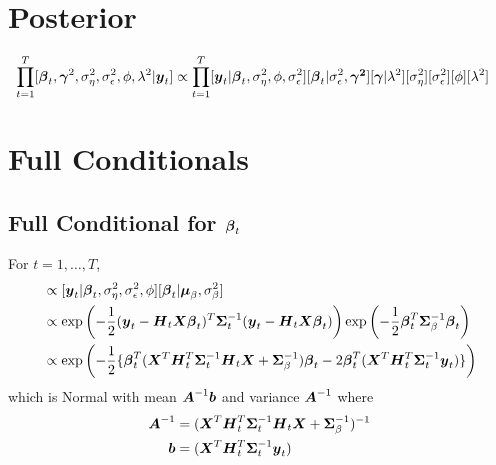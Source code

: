 \documentclass[fleqn]{article}
\def\bm#1{\mbox{\boldmath $#1$}}
\begin{document}
\section{Posterior}
%
\begin{align*}
\prod_{t = 1}^T [\bm{\beta}_t, \bm{\gamma}^2, \sigma^2_\eta, \sigma^2_\epsilon, \phi, \lambda^2 | \bm{y}_t] & \propto \prod_{t = 1}^T [\bm{y}_t | \bm{\beta}_t, \sigma^2_\eta, \phi, \sigma^2_\epsilon] [\bm{\beta}_t | \sigma^2_\epsilon, \bm{\gamma^2}] [\bm{\gamma} | \lambda^2] [\sigma^2_\eta] [\sigma^2_\epsilon] [\phi] [\lambda^2]
\end{align*}
%
\section{Full Conditionals}
%
\subsection{Full Conditional for $\bm{\beta}_t$}
%
For $t = 1, \ldots, T$,
\begin{align*}
[\bm{\beta}_t | \cdot] & \propto [\bm{y}_t | \bm{\beta}_t, \sigma^2_\eta, \sigma^2_\epsilon, \phi] [\bm{\beta}_t | \bm{\mu}_\beta, \sigma^2_\beta]\\
%
& \propto \exp{ \left( - \frac{1} {2} (\bm{y}_t - \bm{H}_t \bm{X} \bm{\beta}_t)^T \bm{\Sigma}_t^{ - 1} (\bm{y}_t - \bm{H}_t \bm{X} \bm{\beta}_t) \right) } \exp{ \left( - \frac{1} {2} \bm{\beta}_t^T \bm{\Sigma}_\beta^{ - 1} \bm{\beta}_t \right) }\\
%
& \propto \exp{ \left( - \frac{1} {2} \{\bm{\beta}_t^T (\bm{X}^T \bm{H}_t^T \bm{\Sigma}_t^{ - 1} \bm{H}_t \bm{X} + \bm{\Sigma}_\beta^{ - 1}) \bm{\beta}_t - 2 \bm{\beta}_t^T (\bm{X}^T \bm{H}_t^T \bm{\Sigma}_t^{ - 1} \bm{y}_t) \} \right) }
\end{align*}
%
which is Normal with mean $ \bm{A}^{ - 1} \bm{b}$ and variance $\bm{A}^{ - 1}$ where
\begin{align*}
  \bm{A}^{ - 1} & = (\bm{X}^T \bm{H}_t^T \bm{\Sigma}_t^{ - 1} \bm{H}_t \bm{X} + \bm{\Sigma}_\beta^{ - 1})^{ - 1}\\
  \bm{b} & = (\bm{X}^T \bm{H}_t^T \bm{\Sigma}_t^{ - 1} \bm{y}_t)\\
\end{align*}
%
\end{document}
